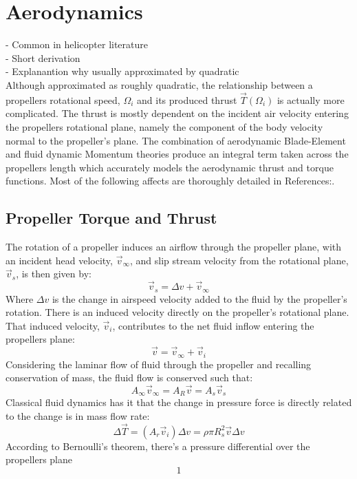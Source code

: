 \section{Aerodynamics}
\label{sec:dynamics.aero}
- Common in helicopter literature\\
- Short derivation\\
- Explanantion why usually approximated by quadratic\\
Although approximated as roughly quadratic, the relationship between a propellers rotational speed, $\Omega_i$ and its produced thrust $\vec{T}(\Omega_i)$ is actually more complicated. The thrust is mostly dependent on the incident air velocity entering the propellers rotational plane, namely the component of the body velocity normal to the propeller's plane. The combination of aerodynamic Blade-Element\cite{.} and fluid dynamic Momentum\cite{.} theories produce an integral term taken across the propellers length which accurately models the aerodynamic thrust and torque functions. Most of the following affects are thoroughly detailed in References:\cite{.,.,.}.
\subsection{Propeller Torque and Thrust}
\label{subsec:dynamics.aero.bem}
The rotation of a propeller induces an airflow through the propeller plane, with an incident head velocity, $\vec{v}_\infty$, and slip stream velocity from the rotational plane, $\vec{v}_s$, is then given by:
\begin{equation}
\vec{v}_s=\Delta v + \vec{v}_\infty
\end{equation}
Where $\Delta v$ is the change in airspeed velocity added to the fluid by the propeller's rotation. There is an induced velocity directly on the propeller's rotational plane. That induced velocity, $\vec{v}_i$, contributes to the net fluid inflow entering the propellers plane:
\begin{equation}
\vec{v}=\vec{v}_\infty+\vec{v}_i
\end{equation}
Considering the laminar flow of fluid through the propeller and recalling conservation of mass, the fluid flow is conserved such that:
\begin{equation}
A_\infty \vec{v}_\infty=A_R\vec{v}=A_s\vec{v}_s
\end{equation}
Classical fluid dynamics\cite{.} has it that the change in pressure force is directly related to the change is in mass flow rate:
\begin{equation}
\Delta\vec{T}=(A_r \vec{v}_i)\Delta v=\rho\pi R_s^2\vec{v}\Delta v
\end{equation}
According to Bernoulli's theorem, there's a pressure differential over the propellers plane
\begin{equation}
1
\end{equation}
